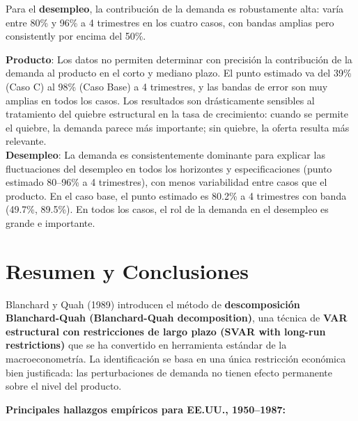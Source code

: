 \documentclass[12pt]{article}
\begin{document}
Para el \textbf{desempleo}, la contribuci\'on de la demanda es robustamente alta: var\'ia entre 80\% y 96\% a 4 trimestres en los cuatro casos, con bandas amplias pero consistently por encima del 50\%.

\begin{hallazgo}
\textbf{Producto}: Los datos no permiten determinar con precisi\'on la contribuci\'on de la demanda al producto en el corto y mediano plazo. El punto estimado va del 39\% (Caso C) al 98\% (Caso Base) a 4 trimestres, y las bandas de error son muy amplias en todos los casos. Los resultados son dr\'asticamente sensibles al tratamiento del quiebre estructural en la tasa de crecimiento: cuando se permite el quiebre, la demanda parece m\'as importante; sin quiebre, la oferta resulta m\'as relevante. \\[4pt]
\textbf{Desempleo}: La demanda es consistentemente dominante para explicar las fluctuaciones del desempleo en todos los horizontes y especificaciones (punto estimado 80--96\% a 4 trimestres), con menos variabilidad entre casos que el producto. En el caso base, el punto estimado es 80.2\% a 4 trimestres con banda (49.7\%, 89.5\%). En todos los casos, el rol de la demanda en el desempleo es grande e importante.
\end{hallazgo}

\section{Resumen y Conclusiones}

Blanchard y Quah (1989) introducen el m\'etodo de \textbf{descomposici\'on Blanchard-Quah (Blanchard-Quah decomposition)}, una t\'ecnica de \textbf{VAR estructural con restricciones de largo plazo (SVAR with long-run restrictions)} que se ha convertido en herramienta est\'andar de la macroeconometr\'ia. La identificaci\'on se basa en una \'unica restricci\'on econ\'omica bien justificada: las perturbaciones de demanda no tienen efecto permanente sobre el nivel del producto.

\textbf{Principales hallazgos emp\'iricos para EE.UU., 1950--1987:}
\end{document}
